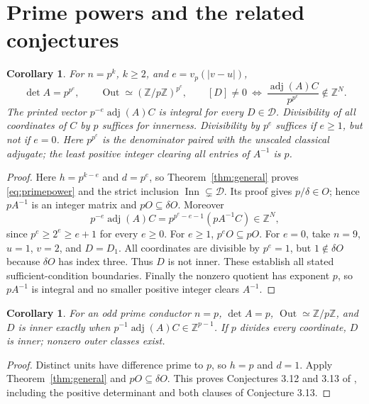 \documentclass[11pt]{article}
\newtheorem{corollary}[theorem]{Corollary}
\newcommand{\ZZ}{\mathbb Z}
\newcommand{\Der}{\mathcal D}
\newcommand{\Inn}{\operatorname{Inn}}
\newcommand{\Out}{\operatorname{Out}}
\newcommand{\adj}{\operatorname{adj}}
\begin{document}
\section{Prime powers and the related conjectures}
\begin{corollary}\label{cor:primepower}
For $n=p^k$, $k\geq2$, and $e=v_p(|v-u|)$,
\begin{equation}\label{eq:primepower}
 \det A=p^{p^e},\qquad \Out\simeq(\ZZ/p\ZZ)^{p^e},\qquad
 [D]\neq0\ \Longleftrightarrow\ \frac{\adj(A)C}{p^{p^e}}\notin\ZZ^N.
\end{equation}
The printed vector $p^{-e}\adj(A)C$ is integral for every $D\in\Der$.
Divisibility of all coordinates of $C$ by $p$ suffices for innerness.
Divisibility by $p^e$ suffices if $e\geq1$, but not if $e=0$.
Here $p^{p^e}$ is the denominator paired with the unscaled classical
adjugate; the least positive integer clearing all entries of $A^{-1}$
is $p$.
\end{corollary}
\begin{proof}
Here $h=p^{k-e}$ and $d=p^e$, so Theorem~\ref{thm:general} proves
\eqref{eq:primepower} and the strict inclusion $\Inn\subsetneq\Der$.
Its proof gives $p/\delta\in O$; hence $pA^{-1}$ is an integer matrix
and $pO\subseteq\delta O$. Moreover
\[
 p^{-e}\adj(A)C=p^{p^e-e-1}(pA^{-1}C)\in\ZZ^N,
\]
since $p^e\geq2^e\geq e+1$ for every $e\geq0$.
For $e\geq1$, $p^eO\subseteq pO$. For $e=0$, take $n=9$, $u=1$,
$v=2$, and $D=D_1$. All coordinates are divisible by $p^e=1$, but
$1\notin\delta O$ because $\delta O$ has index three. Thus $D$ is
not inner. These establish all stated sufficient-condition boundaries.
Finally the nonzero quotient has exponent $p$, so $pA^{-1}$ is integral
and no smaller positive integer clears $A^{-1}$.
\end{proof}

\begin{corollary}\label{cor:prime}
For an odd prime conductor $n=p$, $\det A=p$,
$\Out\simeq\ZZ/p\ZZ$, and $D$ is inner exactly when
$p^{-1}\adj(A)C\in\ZZ^{p-1}$. If $p$ divides every coordinate,
$D$ is inner; nonzero outer classes exist.
\end{corollary}
\begin{proof}
Distinct units have difference prime to $p$, so $h=p$ and $d=1$.
Apply Theorem~\ref{thm:general} and $pO\subseteq\delta O$.
This proves Conjectures 3.12 and 3.13 of \cite[p.~18]{MSrings},
including the positive determinant and both clauses of Conjecture 3.13.
\end{proof}
\end{document}
